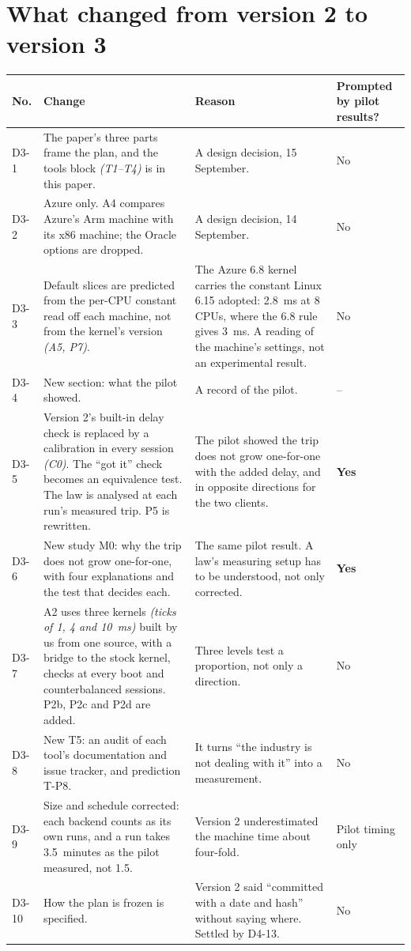 \documentclass[11pt]{article}
\newcommand{\gl}[1]{{\color{soft}\itshape\small (#1)}}
\begin{document}
\section*{What changed from version 2 to version 3}
{\small
\begin{longtable}{@{}p{1.0cm} >{\raggedright\arraybackslash}p{6.6cm} >{\raggedright\arraybackslash}p{5.9cm} >{\raggedright\arraybackslash}p{1.9cm}@{}}
\toprule
\textbf{No.} & \textbf{Change} & \textbf{Reason} & \textbf{Prompted by pilot results?} \\
\midrule
\endhead
D3-1 & The paper's three parts frame the plan, and the tools block \gl{T1--T4} is in this paper. & A design decision, 15 September. & No \\
D3-2 & Azure only. A4 compares Azure's Arm machine with its x86 machine; the Oracle options are dropped. & A design decision, 14 September. & No \\
D3-3 & Default slices are predicted from the per-CPU constant read off each machine, not from the kernel's version \gl{A5, P7}. & The Azure 6.8 kernel carries the constant Linux 6.15 adopted: 2.8~ms at 8 CPUs, where the 6.8 rule gives 3~ms. A reading of the machine's settings, not an experimental result. & No \\
D3-4 & New section: what the pilot showed. & A record of the pilot. & -- \\
D3-5 & Version 2's built-in delay check is replaced by a calibration in every session \gl{C0}. The ``got it'' check becomes an equivalence test. The law is analysed at each run's measured trip. P5 is rewritten. & The pilot showed the trip does not grow one-for-one with the added delay, and in opposite directions for the two clients. & \textbf{Yes} \\
D3-6 & New study M0: why the trip does not grow one-for-one, with four explanations and the test that decides each. & The same pilot result. A law's measuring setup has to be understood, not only corrected. & \textbf{Yes} \\
D3-7 & A2 uses three kernels \gl{ticks of 1, 4 and 10~ms} built by us from one source, with a bridge to the stock kernel, checks at every boot and counterbalanced sessions. P2b, P2c and P2d are added. & Three levels test a proportion, not only a direction. & No \\
D3-8 & New T5: an audit of each tool's documentation and issue tracker, and prediction T-P8. & It turns ``the industry is not dealing with it'' into a measurement. & No \\
D3-9 & Size and schedule corrected: each backend counts as its own runs, and a run takes 3.5~minutes as the pilot measured, not 1.5. & Version 2 underestimated the machine time about four-fold. & Pilot timing only \\
D3-10 & How the plan is frozen is specified. & Version 2 said ``committed with a date and hash'' without saying where. Settled by D4-13. & No \\
\bottomrule
\end{longtable}}
\end{document}
